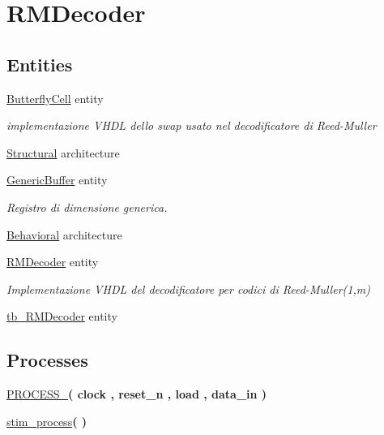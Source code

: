 \hypertarget{group___r_m_decoder}{\section{R\+M\+Decoder}
\label{group___r_m_decoder}
}
\subsection*{Entities}
\begin{DoxyCompactItemize}
\item 
\hyperlink{class_butterfly_cell}{Butterfly\+Cell} entity
\begin{DoxyCompactList}\small\item\em implementazione V\+H\+D\+L dello swap usato nel decodificatore di Reed-\/\+Muller \end{DoxyCompactList}\item 
\hyperlink{class_butterfly_cell_1_1_structural}{Structural} architecture
\item 
\hyperlink{class_generic_buffer}{Generic\+Buffer} entity
\begin{DoxyCompactList}\small\item\em Registro di dimensione generica. \end{DoxyCompactList}\item 
\hyperlink{class_generic_buffer_1_1_behavioral}{Behavioral} architecture
\item 
\hyperlink{class_r_m_decoder}{R\+M\+Decoder} entity
\begin{DoxyCompactList}\small\item\em Implementazione V\+H\+D\+L del decodificatore per codici di Reed-\/\+Muller(1,m) \end{DoxyCompactList}\item 
\hyperlink{classtb___r_m_decoder}{tb\+\_\+\+R\+M\+Decoder} entity
\end{DoxyCompactItemize}
\subsection*{Processes}
 \begin{DoxyCompactItemize}
\item 
\hypertarget{group___r_m_decoder_ga2ee480e118ca2b3fccf26139a66e84ad}{\hyperlink{group___r_m_decoder_ga2ee480e118ca2b3fccf26139a66e84ad}{P\+R\+O\+C\+E\+S\+S\+\_}{\bfseries  ( {\bfseries \textcolor{vhdlchar}{clock}\textcolor{vhdlchar}{ }} , {\bfseries \textcolor{vhdlchar}{reset\+\_\+n}\textcolor{vhdlchar}{ }} , {\bfseries \textcolor{vhdlchar}{load}\textcolor{vhdlchar}{ }} , {\bfseries \textcolor{vhdlchar}{data\+\_\+in}\textcolor{vhdlchar}{ }} )}}\label{group___r_m_decoder_ga2ee480e118ca2b3fccf26139a66e84ad}

\item 
\hypertarget{group___r_m_decoder_gaee7e8b077315d73d2c245522dd7ba9a8}{\hyperlink{group___r_m_decoder_gaee7e8b077315d73d2c245522dd7ba9a8}{stim\+\_\+process}{\bfseries  (  )}}\label{group___r_m_decoder_gaee7e8b077315d73d2c245522dd7ba9a8}

\end{DoxyCompactItemize}
